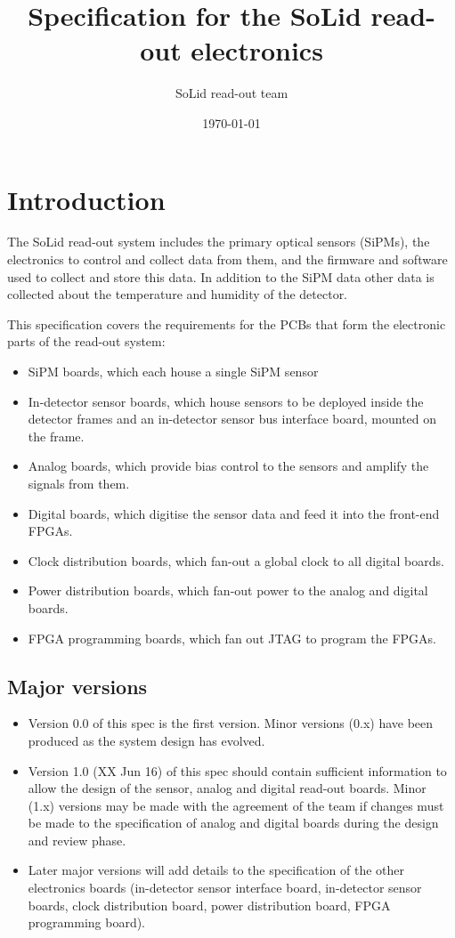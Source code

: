 \documentclass[a4paper]{article}
\title{Specification for the SoLid read-out electronics}
\author[]{SoLid read-out team}
\date{\today\\\version}
\begin{document}
\maketitle

\tableofcontents

\section{Introduction}

The SoLid read-out system includes the primary optical sensors (SiPMs), the electronics to control and collect data from them, and the firmware and software used to collect and store this data.
In addition to the SiPM data other data is collected about the temperature and humidity of the detector.

This specification covers the requirements for the PCBs that form the electronic parts of the read-out system:
\begin{itemize}
    \item SiPM boards, which each house a single SiPM sensor
    \item In-detector sensor boards, which house sensors to be deployed inside the detector frames and an in-detector sensor bus interface board, mounted on the frame.
    \item Analog boards, which provide bias control to the sensors and amplify the signals from them.
    \item Digital boards, which digitise the sensor data and feed it into the front-end FPGAs.
    \item Clock distribution boards, which fan-out a global clock to all digital boards.
    \item Power distribution boards, which fan-out power to the analog and digital boards.
    \item FPGA programming boards, which fan out JTAG to program the FPGAs.
\end{itemize}


\subsection{Major versions}

\begin{itemize}
    \item Version 0.0 of this spec is the first version. Minor versions (0.x) have been produced as the system design has evolved.
    \item Version 1.0 (XX Jun 16) of this spec should contain sufficient information to allow the design of the sensor, analog and digital read-out boards. Minor (1.x) versions may be made with the agreement of the team if changes must be made to the specification of analog and digital boards during the design and review phase.
    \item Later major versions will add details to the specification of the other electronics boards (in-detector sensor interface board, in-detector sensor boards, clock distribution board, power distribution board, FPGA programming board).
\end{itemize}
\end{document}
